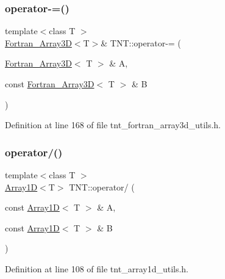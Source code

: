 \mbox{\label{namespaceTNT_ac3eb8bd76e8c6e92d7633421b2f27905}} 
\subsubsection{\texorpdfstring{operator-\/=()}{operator-=()}\hspace{0.1cm}{\footnotesize\ttfamily [5/5]}}
{\footnotesize\ttfamily template$<$class T $>$ \\
\hyperlink{classTNT_1_1Fortran__Array3D}{Fortran\+\_\+\+Array3D}$<$T$>$\& T\+N\+T\+::operator-\/= (\begin{DoxyParamCaption}\item[{\hyperlink{classTNT_1_1Fortran__Array3D}{Fortran\+\_\+\+Array3D}$<$ T $>$ \&}]{A,  }\item[{const \hyperlink{classTNT_1_1Fortran__Array3D}{Fortran\+\_\+\+Array3D}$<$ T $>$ \&}]{B }\end{DoxyParamCaption})}



Definition at line 168 of file tnt\+\_\+fortran\+\_\+array3d\+\_\+utils.\+h.

\mbox{\label{namespaceTNT_aba09c30731e80420cd42fff00f72b18b}} 
\subsubsection{\texorpdfstring{operator/()}{operator/()}\hspace{0.1cm}{\footnotesize\ttfamily [1/5]}}
{\footnotesize\ttfamily template$<$class T $>$ \\
\hyperlink{classTNT_1_1Array1D}{Array1D}$<$T$>$ T\+N\+T\+::operator/ (\begin{DoxyParamCaption}\item[{const \hyperlink{classTNT_1_1Array1D}{Array1D}$<$ T $>$ \&}]{A,  }\item[{const \hyperlink{classTNT_1_1Array1D}{Array1D}$<$ T $>$ \&}]{B }\end{DoxyParamCaption})}



Definition at line 108 of file tnt\+\_\+array1d\+\_\+utils.\+h.

\mbox{\label{namespaceTNT_a2252a78369b90a4852da38ce2d8a732b}} 
